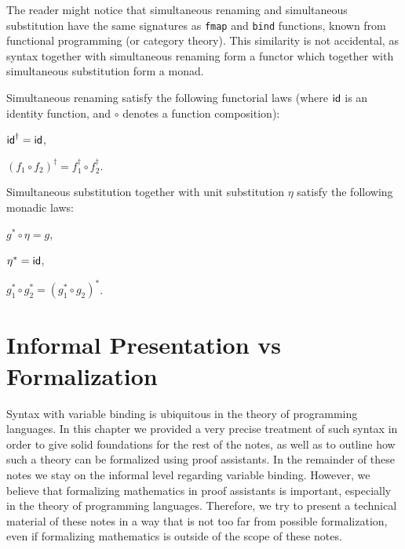 The reader might notice that simultaneous renaming
and simultaneous substitution
have the same signatures as \texttt{fmap} and \texttt{bind}
functions, known from functional programming (or category theory).
This similarity is not accidental,
as syntax together with simultaneous renaming form a functor
which together with simultaneous substitution form a monad.

\begin{lemma}
  Simultaneous renaming satisfy the following functorial laws
  (where $\mathsf{id}$ is an identity function,
  and $\circ$ denotes a function composition):
  \begin{thmenumerate}
  \item $\mathsf{id}^\dagger = \mathsf{id}$,
  \item $(f_1\circ f_2)^\dagger = f_1^\dagger \circ f_2^\dagger$.
  \end{thmenumerate}
\end{lemma}

\begin{lemma}
  Simultaneous substitution together with unit substitution $\eta$
  satisfy the following monadic laws:
  \begin{thmenumerate}
  \item $g^* \circ \eta = g$,
  \item $\eta^* = \mathsf{id}$,
  \item $g_1^* \circ g_2^* = (g_1^* \circ g_2)^*$.
  \end{thmenumerate}
\end{lemma}

\section{Informal Presentation vs Formalization}

Syntax with variable binding is ubiquitous in the theory of programming
languages.
In this chapter we provided a very precise treatment of such syntax
in order to give solid foundations for the rest of the notes,
as well as to outline how such a theory can be formalized
using proof assistants.
In the remainder of these notes we stay
on the informal level regarding variable binding.
However, we believe that formalizing mathematics in proof assistants
is important, especially in the theory of programming languages.
Therefore, we try to present a technical material of these notes
in a way that is not too far from possible formalization,
even if formalizing mathematics is outside of the scope of these notes.

